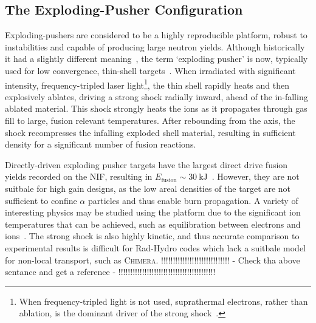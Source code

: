 \subsection{The Exploding-Pusher Configuration}%
\label{sec:Res2_expl}

Exploding-pushers are considered to be a highly reproducible platform, robust to instabilities and capable of producing large neutron yields.
Although historically it had a slightly different meaning~\cite{craxton_direct-drive_2015}, the term `exploding pusher' is now, typically used for low convergence, thin-shell targets~\cite{ellison_development_2018}.
When irradiated with significant intensity, frequency-tripled laser light\footnote{When frequency-tripled light is not used, suprathermal electrons, rather than ablation, is the dominant driver of the strong shock~\cite{yeamans_high_2021}.}, the thin shell rapidly heats and then explosively ablates, driving a strong shock radially inward, ahead of the in-falling ablated material.
This shock strongly heats the ions as it propagates through gas fill to large, fusion relevant temperatures.
After rebounding from the axis, the shock recompresses the infalling exploded shell material, resulting in sufficient density for a significant number of fusion reactions.

Directly-driven exploding pusher targets have the largest direct drive fusion yields recorded on the \ac{NIF}, resulting in $E_{\text{fusion}}\sim 30\ \text{kJ}$~\cite{yeamans_high_2021}.
However, they are not suitbale for high gain designs, as the low areal densities of the target are not sufficient to confine $\alpha$ particles and thus enable burn propagation.
A variety of interesting physics may be studied using the platform due to the significant ion temperatures that can be achieved, such as equilibration between electrons and ions~\cite{benedict_molecular_2012}.
The strong shock is also highly kinetic, and thus accurate comparison to experimental results is difficult for \ac{Rad-Hydro} codes which lack a suitbale model for non-local transport, such as \textsc{Chimera}.
!!!!!!!!!!!!!!!!!!!!!!!!!!!!! - Check tha above sentance and get a reference - !!!!!!!!!!!!!!!!!!!!!!!!!!!!!!!!!!!!!!!!!

